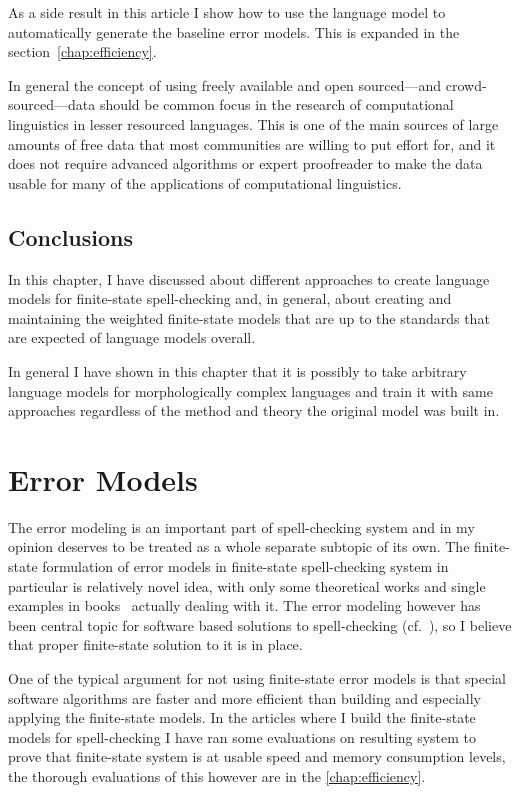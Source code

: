 \documentclass[officiallayout]{unihelcompling}
\begin{document}
As a side result in this article I show how to use the language model to
automatically generate the baseline error models. This is expanded in
the section~\ref{chap:efficiency}.

In general the concept of using freely available and open sourced---and
crowd-sourced---data should be common focus in the research of computational
linguistics in lesser resourced languages. This is one of the main sources of
large amounts of free data that most communities are willing to put effort for,
and it does not require advanced algorithms or expert proofreader to make the
data usable for many of the applications of computational linguistics.

\section{Conclusions}

In this chapter, I have discussed about different approaches to create language
models for finite-state spell-checking and, in general, about creating and
maintaining the weighted finite-state models that are up to the standards that
are expected of language models overall. 

In general I have shown in this chapter that it is possibly to take arbitrary
language models for morphologically complex languages and train it with same
approaches regardless of the method and theory the original model was built in.


\chapter{Error Models}
\label{chap:error-models}

The error modeling is an important part of spell-checking system and in my
opinion deserves to be treated as a whole separate subtopic of its own. The
finite-state formulation of error models in finite-state spell-checking system
in particular is relatively novel idea, with only some theoretical works
\citep{agata2002typographical,mohri2003edit} and single examples in
books~\citep{beesley2003finite} actually dealing with it. The error modeling
however has been central topic for software based solutions to spell-checking
(cf.~\citep{kukich1992spelling,mitton2009ordering,deorowicz2005correcting}), so
I believe that proper finite-state solution to it is in place.

One of the typical argument for not using finite-state error models is that
special software algorithms are faster and more efficient than building and
especially applying the finite-state models. In the articles where I build
the finite-state models for spell-checking I have ran some evaluations on
resulting system to prove that finite-state system is at usable speed
and memory consumption levels, the thorough evaluations of this however
are in the \ref{chap:efficiency}.
\end{document}
